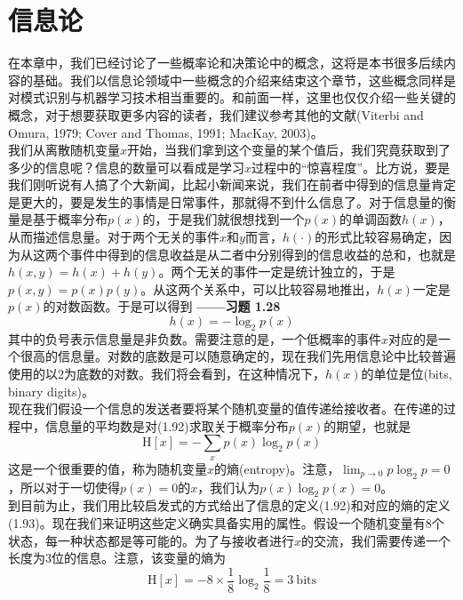 \documentclass[b5paper]{book}
\numberwithin{equation}{chapter}
\begin{document}
	\section{信息论}
	\noindent{\color{red} \rule[5pt]{\textwidth}{0.1em}}
	\textnormal{
	\indent 在本章中，我们已经讨论了一些概率论和决策论中的概念，这将是本书很多后续内容的基础。我们以信息论领域中一些概念的介绍来结束这个章节，这些概念同样是对模式识别与机器学习技术相当重要的。和前面一样，这里也仅仅介绍一些关键的概念，对于想要获取更多内容的读者，我们建议参考其他的文献(Viterbi and Omura, 1979; Cover and Thomas, 1991; MacKay, 2003)。\\
	\indent 我们从离散随机变量$x$开始，当我们拿到这个变量的某个值后，我们究竟获取到了多少的信息呢？信息的数量可以看成是学习$x$过程中的“惊喜程度”。比方说，要是我们刚听说有人搞了个大新闻，比起小新闻来说，我们在前者中得到的信息量肯定是更大的，要是发生的事情是日常事件，那就得不到什么信息了。对于信息量的衡量是基于概率分布$p(x)$的，于是我们就很想找到一个$p(x)$的单调函数$h(x)$，从而描述信息量。对于两个无关的事件$x$和$y$而言，$h(\cdot)$的形式比较容易确定，因为从这两个事件中得到的信息收益是从二者中分别得到的信息收益的总和，也就是$h(x,y)=h(x)+h(y)$。两个无关的事件一定是统计独立的，于是$p(x,y)=p(x)p(y)$。从这两个关系中，可以比较容易地推出，$h(x)$一定是$p(x)$的对数函数。于是可以得到\color{red} \textbf{——习题 1.28}　\color{black}
	\begin{equation}
		h(x)=-\log_2p(x)
	\end{equation}
	其中的负号表示信息量是非负数。需要注意的是，一个低概率的事件$x$对应的是一个很高的信息量。对数的底数是可以随意确定的，现在我们先用信息论中比较普遍使用的以2为底数的对数。我们将会看到，在这种情况下，$h(x)$的单位是位(bits, binary digits)。\\
	\indent 现在我们假设一个信息的发送者要将某个随机变量的值传递给接收者。在传递的过程中，信息量的平均数是对(1.92)求取关于概率分布$p(x)$的期望，也就是
	\begin{equation}
		\mathrm{H}[x]=-\sum_x p(x)\log_2 p(x)
	\end{equation}
	这是一个很重要的值，称为随机变量$x$的熵(entropy)。注意，$\lim_{p \rightarrow 0} p\log_2 p = 0$，所以对于一切使得$p(x)=0$的$x$，我们认为$p(x)\log_2 p(x)=0$。\\
	\indent 到目前为止，我们用比较启发式的方式给出了信息的定义(1.92)和对应的熵的定义(1.93)。现在我们来证明这些定义确实具备实用的属性。假设一个随机变量有8个状态，每一种状态都是等可能的。为了与接收者进行$x$的交流，我们需要传递一个长度为3位的信息。注意，该变量的熵为
		\[ \mathrm{H}[x]=-8 \times \frac{1}{8}\log_2 \frac{1}{8} =3 \ \mathrm{bits} \]
}
\end{document}
